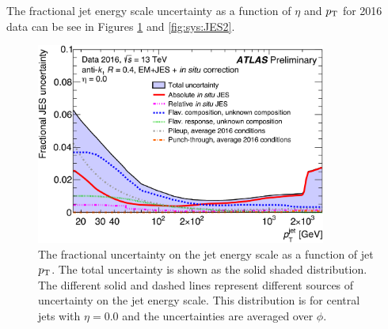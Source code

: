 
\indent The fractional jet energy scale uncertainty as a function of $\eta$ and $\pt$ for 2016 data can be see in Figures \ref{fig:sys:JES1} and \ref{fig:sys:JES2}. \\

\begin{figure}[!h]
\begin{center}
\includegraphics[width=0.85\textwidth]{figures/JetCalib/JES_pt.png}
\caption[The fractional uncertainty on the jet energy scale vs jet $\pt$. ]{The fractional uncertainty on the jet energy scale as a function of jet $\pt$.  The total uncertainty is shown as the solid shaded distribution.  The different solid and dashed lines represent different sources of uncertainty on the jet energy scale. This distribution is for central jets with $\eta = 0.0$ and the uncertainties are averaged over $\phi$.}
\label{fig:sys:JES1}
\end{center}
\end{figure}

